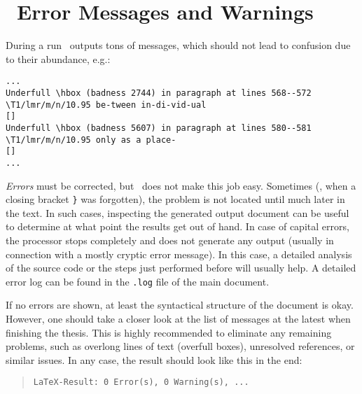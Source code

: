 \section{\latex\ Error Messages and Warnings}

During a run \latex\ outputs tons of messages, which should not lead to
confusion due to their abundance, e.g.:

\begin{scriptsize}
\begin{verbatim}
...
Underfull \hbox (badness 2744) in paragraph at lines 568--572
\T1/lmr/m/n/10.95 be-tween in-di-vid-ual
[]
Underfull \hbox (badness 5607) in paragraph at lines 580--581
\T1/lmr/m/n/10.95 only as a place-
[]
...
\end{verbatim}
\end{scriptsize}
%
\emph{Errors} must be corrected, but \latex\ does not make this job easy.
Sometimes (\eg, when a closing bracket \verb!}! was forgotten), the problem is
not located until much later in the text. In such cases, inspecting the
generated output document can be useful to determine at what point the results
get out of hand. In case of capital errors, the \latex processor stops
completely and does not generate any output (usually in connection with a mostly
 cryptic error message). In this case, a detailed analysis of the source code or
 the steps just performed before will usually help. A detailed error log can be
 found in the \verb!.log! file of the main document.

If no errors are shown, at least the syntactical structure of the document is
okay. However, one should take a closer look at the list of messages at the
latest when finishing the thesis. This is highly recommended to eliminate any
remaining problems, such as overlong lines of text (overfull boxes), unresolved
references, or similar issues. In any case, the result should look like this in
the end:
%
\begin{quote}
    \verb!LaTeX-Result: 0 Error(s), 0 Warning(s), ...!
\end{quote}
